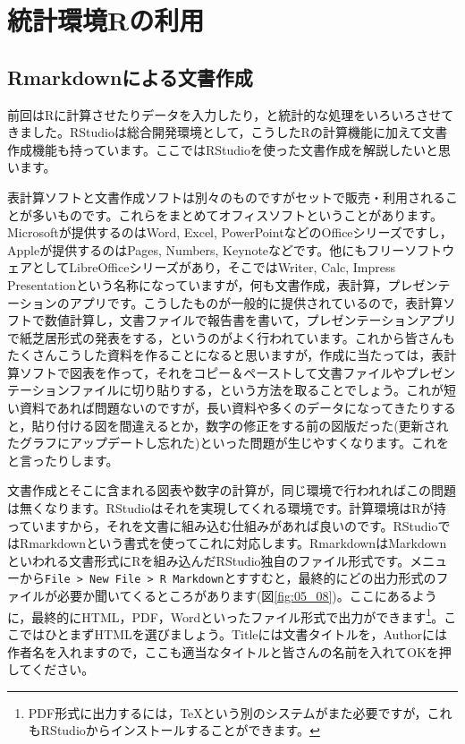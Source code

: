 \documentclass{ltjsbook}
\begin{document}
\VerbatimFootnotes
\chapter{統計環境Rの利用}
\label{m04_usingR}

\section{Rmarkdownによる文書作成}
\label{Rmarkdown}
前回はRに計算させたりデータを入力したり，と統計的な処理をいろいろさせてきました。RStudioは総合開発環境として，こうしたRの計算機能に加えて文書作成機能も持っています。ここではRStudioを使った文書作成を解説したいと思います。

表計算ソフトと文書作成ソフトは別々のものですがセットで販売・利用されることが多いものです。これらをまとめてオフィスソフトということがあります。Microsoftが提供するのはWord, Excel, PowerPointなどのOfficeシリーズですし，Appleが提供するのはPages, Numbers, Keynoteなどです。他にもフリーソフトウェアとしてLibreOfficeシリーズがあり，そこではWriter, Calc, Impress Presentationという名称になっていますが，何も文書作成，表計算，プレゼンテーションのアプリです。こうしたものが一般的に提供されているので，表計算ソフトで数値計算し，文書ファイルで報告書を書いて，プレゼンテーションアプリで紙芝居形式の発表をする，というのがよく行われています。これから皆さんもたくさんこうした資料を作ることになると思いますが，作成に当たっては，表計算ソフトで図表を作って，それをコピー＆ペーストして文書ファイルやプレゼンテーションファイルに切り貼りする，という方法を取ることでしょう。これが短い資料であれば問題ないのですが，長い資料や多くのデータになってきたりすると，貼り付ける図を間違えるとか，数字の修正をする前の図版だった(更新されたグラフにアップデートし忘れた)といった問題が生じやすくなります。これをと言ったりします。

文書作成とそこに含まれる図表や数字の計算が，同じ環境で行われればこの問題は無くなります。RStudioはそれを実現してくれる環境です。計算環境はRが持っていますから，それを文書に組み込む仕組みがあれば良いのです。RStudioではRmarkdownという書式を使ってこれに対応します。RmarkdownはMarkdownといわれる文書形式にRを組み込んだRStudio独自のファイル形式です。メニューから\verb|File > New File > R Markdown|とすすむと，最終的にどの出力形式のファイルが必要か聞いてくるところがあります(図\ref{fig:05_08})。ここにあるように，最終的にHTML，PDF，Wordといったファイル形式で出力ができます\footnote{PDF形式に出力するには，TeXという別のシステムがまた必要ですが，これもRStudioからインストールすることができます。}。ここではひとまずHTMLを選びましょう。Titleには文書タイトルを，Authorには作者名を入れますので，ここも適当なタイトルと皆さんの名前を入れてOKを押してください。
\end{document}
